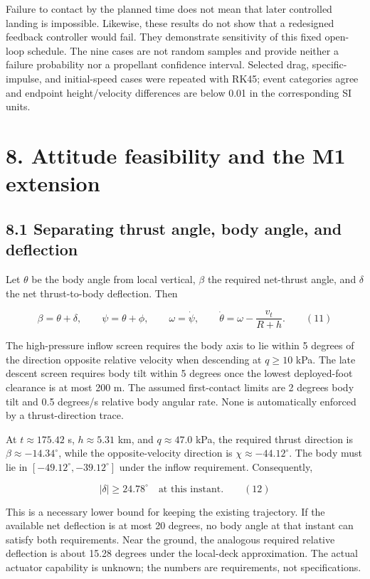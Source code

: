 \documentclass[
  11pt,
  a4paper,
]{article}
\begin{document}
Failure to contact by the planned time does not mean that later
controlled landing is impossible. Likewise, these results do not show
that a redesigned feedback controller would fail. They demonstrate
sensitivity of this fixed open-loop schedule. The nine cases are not
random samples and provide neither a failure probability nor a
propellant confidence interval. Selected drag, specific-impulse, and
initial-speed cases were repeated with RK45; event categories agree and
endpoint height/velocity differences are below 0.01 in the corresponding
SI units.

\section{8. Attitude feasibility and the M1
extension}\label{attitude-feasibility-and-the-m1-extension}

\subsection{8.1 Separating thrust angle, body angle, and
deflection}\label{separating-thrust-angle-body-angle-and-deflection}

Let \(\theta\) be the body angle from local vertical, \(\beta\) the
required net-thrust angle, and \(\delta\) the net thrust-to-body
deflection. Then

\[ \beta=\theta+\delta,\qquad\psi=\theta+\phi,\qquad\omega=\dot\psi,\qquad\dot\theta=\omega-\frac{v_t}{R+h}. \qquad (11) \]

The high-pressure inflow screen requires the body axis to lie within 5
degrees of the direction opposite relative velocity when descending at
\(q\ge10\) kPa. The late descent screen requires body tilt within 5
degrees once the lowest deployed-foot clearance is at most 200 m. The
assumed first-contact limits are 2 degrees body tilt and 0.5 degrees/s
relative body angular rate. None is automatically enforced by a
thrust-direction trace.

At \(t\approx175.42\) s, \(h\approx5.31\) km, and \(q\approx47.0\) kPa,
the required thrust direction is \(\beta\approx-14.34^\circ\), while the
opposite-velocity direction is \(\chi\approx-44.12^\circ\). The body
must lie in \([-49.12^\circ,-39.12^\circ]\) under the inflow
requirement. Consequently,

\[ |\delta|\ge24.78^\circ\quad\text{at this instant}. \qquad (12) \]

This is a necessary lower bound for keeping the existing trajectory. If
the available net deflection is at most 20 degrees, no body angle at
that instant can satisfy both requirements. Near the ground, the
analogous required relative deflection is about 15.28 degrees under the
local-deck approximation. The actual actuator capability is unknown; the
numbers are requirements, not specifications.
\end{document}
